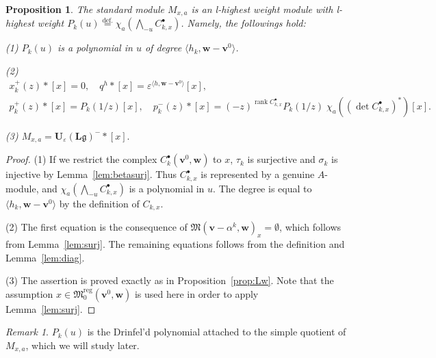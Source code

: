 \documentclass[12pt]{amsart}
\def\Bbb{\mathbb}
\def\frak{\mathfrak}
\newcommand{\rom}{\textup}
\newtheorem{Proposition}[equation]{Proposition}
\theoremstyle{definition}
\theoremstyle{remark}
\newtheorem{Remark}[equation]{Remark}
\numberwithin{equation}{subsection}
\newcommand{\lemref}[1]{Lemma~\ref{#1}}
\newcommand{\propref}[1]{Proposition~\ref{#1}}
\newcommand{\defeq}{\overset{\operatorname{\scriptstyle def.}}{=}}
\newcommand{\C}{{\Bbb C}}
\newcommand{\rank}{\operatorname{rank}}
\newcommand{\M}{{\frak M}} %
\newcommand{\Mreg}{{\frak M_0^{\operatorname{reg}}}}
\newcommand{\bv}{{\mathbf v}} %
\newcommand{\bw}{{\mathbf w}} %
\newcommand{\Ule}{{\mathbf U}_{\varepsilon}({\mathbf L}\mathfrak g)}
\newcommand{\Wedge}{{\textstyle \bigwedge}}
\begin{document}
\begin{Proposition}\label{prop:stdhw}
The standard module $M_{x,a}$ is an {\it l\/}-highest weight module with
{\it l\/}-highest weight 
$P_k(u) \defeq \chi_a\left(\Wedge_{-u} C_{k,x}^\bullet\right)$. Namely,
the followings hold\rom:

\rom{(1)} $P_k(u)$ is a polynomial in $u$ of degree
$\langle h_k, \bw - \bv^0\rangle$.

\rom{(2)}
\begin{gather*}
  x_k^+(z)\ast [x] = 0, \quad 
  q^h \ast [x] = \varepsilon^{\langle h, \bw - \bv^0\rangle}[x], \\
  p_k^+(z)\ast [x] = 
    P_k(1/z)[x], \quad
  p_k^-(z)\ast [x] = (-z)^{\rank C_{k,x}^\bullet}P_k(1/z)\;
  \chi_{a} \left((\det C_{k,x}^{\bullet})^*\right) [x].
\end{gather*}

\rom{(3)}
\(
 M_{x,a}
 = \Ule^-\ast [x].
\)
\end{Proposition}

\begin{proof}
(1) If we restrict the complex $C_k^\bullet(\bv^0,\bw)$ to $x$,
$\tau_k$ is surjective and $\sigma_k$ is injective by
\lemref{lem:betasurj}.
%
Thus $C_{k,x}^\bullet$ is represented by a genuine $A$-module, and
$\chi_a\left(\Wedge_{-u} C_{k,x}^\bullet\right)$ is a
polynomial in $u$. The degree is equal to
$\langle h_k, \bw - \bv^0\rangle$ by the definition of $C_{k,x}$.

(2) The first equation is the consequence of
$\M(\bv-\alpha^k,\bw)_x = \emptyset$, which follows from \lemref{lem:surj}.
The remaining equations follows from the definition and
\lemref{lem:diag}.

(3) The assertion is proved exactly as in \propref{prop:Lw}. Note that 
the assumption $x\in\Mreg(\bv^0,\bw)$ is used here in order to apply
\lemref{lem:surj}.
\end{proof}

\begin{Remark}
$P_k(u)$ is the Drinfel'd polynomial attached to the
simple quotient of $M_{x,a}$, which we will study later.
\end{Remark}
\end{document}
